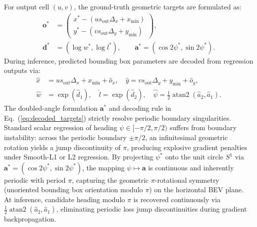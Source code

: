 For output cell $(u, v)$, the ground-truth geometric targets are formulated as:
\begin{align}
    \mathbf{o}^* &= \begin{pmatrix} x^* - (u s_{\mathrm{out}}\Delta_x + x_{\min}) \\ y^* - (v s_{\mathrm{out}}\Delta_y + y_{\min}) \end{pmatrix},\nonumber\\
    \mathbf{d}^* &= (\log w^*, \log l^*), \qquad \mathbf{a}^* = (\cos 2\psi^*, \sin 2\psi^*).
    \label{eq:gt_targets}
\end{align}
During inference, predicted bounding box parameters are decoded from regression outputs via:
\begin{align}
    \hat{x} &= u s_{\mathrm{out}}\Delta_x + x_{\min} + \hat{o}_x, \quad \hat{y} = v s_{\mathrm{out}}\Delta_y + y_{\min} + \hat{o}_y,\nonumber\\
    \hat{w} &= \exp(\hat{d}_1), \quad \hat{l} = \exp(\hat{d}_2), \quad \hat{\psi} = \frac{1}{2}\operatorname{atan2}(\hat{a}_2, \hat{a}_1).
    \label{eq:decoded_targets}
\end{align}
The doubled-angle formulation $\mathbf{a}^*$ and decoding rule in Eq.~(\ref{eq:decoded_targets}) strictly resolve periodic boundary singularities. Standard scalar regression of heading $\psi \in [-\pi/2, \pi/2)$ suffers from boundary instability: across the periodic boundary $\pm \pi/2$, an infinitesimal geometric rotation yields a jump discontinuity of $\pi$, producing explosive gradient penalties under Smooth-L1 or L2 regression. By projecting $\psi^*$ onto the unit circle $S^1$ via $\mathbf{a}^* = (\cos 2\psi^*, \sin 2\psi^*)$, the mapping $\psi \mapsto \mathbf{a}$ is continuous and inherently periodic with period $\pi$, capturing the geometric $\pi$-rotational symmetry (unoriented bounding box orientation modulo $\pi$) on the horizontal BEV plane. At inference, candidate heading modulo $\pi$ is recovered continuously via $\frac{1}{2}\operatorname{atan2}(\hat{a}_2, \hat{a}_1)$, eliminating periodic loss jump discontinuities during gradient backpropagation.

